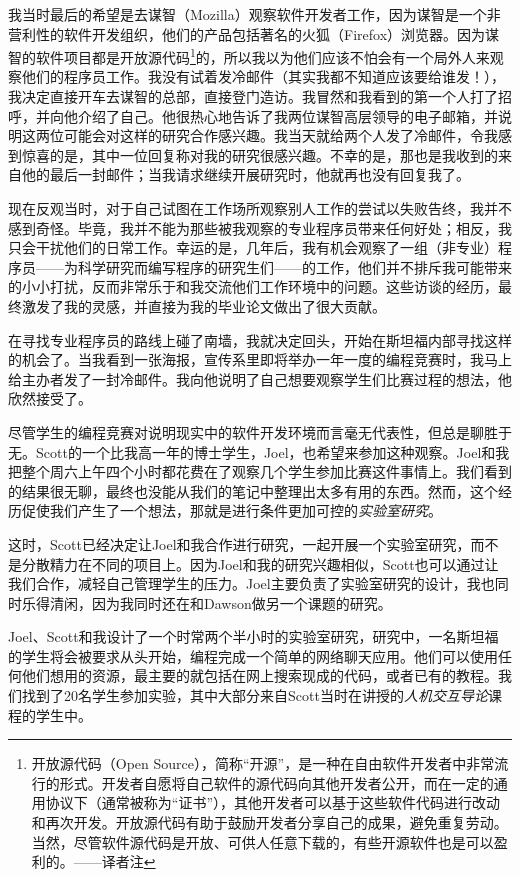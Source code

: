 \documentclass[letter,12pt]{book}
\begin{document}
\begin{CJK}{UTF8}{gbsn}
我当时最后的希望是去谋智（Mozilla）观察软件开发者工作，因为谋智是一个非营利性的软件开发组织，他们的产品包括著名的火狐（Firefox）浏览器。因为谋智的软件项目都是开放源代码\footnote{开放源代码（Open Source），简称“开源”，是一种在自由软件开发者中非常流行的形式。开发者自愿将自己软件的源代码向其他开发者公开，而在一定的通用协议下（通常被称为“证书”），其他开发者可以基于这些软件代码进行改动和再次开发。开放源代码有助于鼓励开发者分享自己的成果，避免重复劳动。当然，尽管软件源代码是开放、可供人任意下载的，有些开源软件也是可以盈利的。——译者注}的，所以我以为他们应该不怕会有一个局外人来观察他们的程序员工作。我没有试着发冷邮件（其实我都不知道应该要给谁发！），我决定直接开车去谋智的总部，直接登门造访。我冒然和我看到的第一个人打了招呼，并向他介绍了自己。他很热心地告诉了我两位谋智高层领导的电子邮箱，并说明这两位可能会对这样的研究合作感兴趣。我当天就给两个人发了冷邮件，令我感到惊喜的是，其中一位回复称对我的研究很感兴趣。不幸的是，那也是我收到的来自他的最后一封邮件；当我请求继续开展研究时，他就再也没有回复我了。

现在反观当时，对于自己试图在工作场所观察别人工作的尝试以失败告终，我并不感到奇怪。毕竟，我并不能为那些被我观察的专业程序员带来任何好处；相反，我只会干扰他们的日常工作。幸运的是，几年后，我有机会观察了一组（非专业）程序员——为科学研究而编写程序的研究生们——的工作，他们并不排斥我可能带来的小小打扰，反而非常乐于和我交流他们工作环境中的问题。这些访谈的经历，最终激发了我的灵感，并直接为我的毕业论文做出了很大贡献。

\breakline

在寻找专业程序员的路线上碰了南墙，我就决定回头，开始在斯坦福内部寻找这样的机会了。当我看到一张海报，宣传系里即将举办一年一度的编程竞赛时，我马上给主办者发了一封冷邮件。我向他说明了自己想要观察学生们比赛过程的想法，他欣然接受了。

尽管学生的编程竞赛对说明现实中的软件开发环境而言毫无代表性，但总是聊胜于无。Scott的一个比我高一年的博士学生，Joel，也希望来参加这种观察。Joel和我把整个周六上午四个小时都花费在了观察几个学生参加比赛这件事情上。我们看到的结果很无聊，最终也没能从我们的笔记中整理出太多有用的东西。然而，这个经历促使我们产生了一个想法，那就是进行条件更加可控的\emph{实验室研究}。

这时，Scott已经决定让Joel和我合作进行研究，一起开展一个实验室研究，而不是分散精力在不同的项目上。因为Joel和我的研究兴趣相似，Scott也可以通过让我们合作，减轻自己管理学生的压力。Joel主要负责了实验室研究的设计，我也同时乐得清闲，因为我同时还在和Dawson做另一个课题的研究。

Joel、Scott和我设计了一个时常两个半小时的实验室研究，研究中，一名斯坦福的学生将会被要求从头开始，编程完成一个简单的网络聊天应用。他们可以使用任何他们想用的资源，最主要的就包括在网上搜索现成的代码，或者已有的教程。我们找到了20名学生参加实验，其中大部分来自Scott当时在讲授的\emph{人机交互导论}课程的学生中。


\end{CJK}
\end{document}
